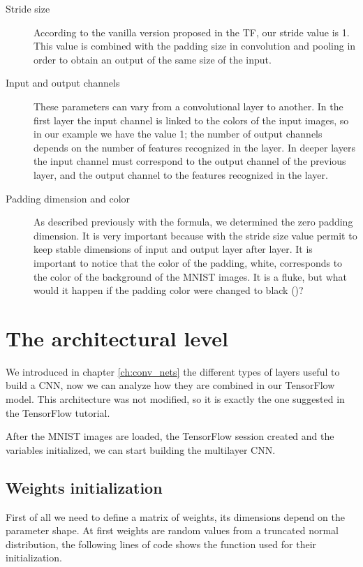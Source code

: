 \begin{description}
	\item[Stride size] According to the vanilla version proposed in the \acs{TF}, our stride value is 1. This value is combined with the padding size in convolution and pooling in order to obtain an output of the same size of the input.
	
	\item[Input and output channels] These parameters can vary from a convolutional layer to another. In the first layer the input channel is linked to the colors of the input images, so in our example we have the value 1; the number of output channels depends on the number of features recognized in the layer. In deeper layers the input channel must correspond to the output channel of the previous layer, and the output channel to the features recognized in the layer.
	
	\item[Padding dimension and color] As described previously with the formula, we determined the zero padding dimension. It is very important because with the stride size value permit to keep stable dimensions of input and output layer after layer. It is important to notice that the color of the padding, \ie white, corresponds to the color of the background of the \acs{MNIST} images. It is a fluke, but what would it happen if the padding color were changed to black ()?

\end{description}

\section{The architectural level}

We introduced in chapter \ref{ch:conv_nets} the different types of layers useful to build a \acs{CNN}, now we can analyze how they are combined in our TensorFlow model. This architecture was not modified, so it is exactly the one suggested in the TensorFlow tutorial.

After the \acs{MNIST} images are loaded, the TensorFlow session created and the variables initialized, we can start building the multilayer \acs{CNN}.

\subsection{Weights initialization}

First of all we need to define a matrix of weights, its dimensions depend on the parameter shape. At first weights are random values from a truncated normal distribution, the following lines of code shows the function used for their initialization.

